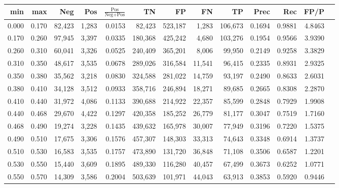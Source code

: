 \begin{tabular}{rrrrrrrrrrrrr}
\toprule
  min &   max &    Neg &   Pos & $\frac{\text{Pos}}{\text{Neg}+\text{Pos}}$ &      TN &      FP &      FN &      TP &   Prec &    Rec &   FP/P \\
\midrule
0.000 & 0.170 & 82,423 & 1,283 &                                     0.0153 &  82,423 & 523,187 &   1,283 & 106,673 & 0.1694 & 0.9881 & 4.8463 \\
0.170 & 0.260 & 97,945 & 3,397 &                                     0.0335 & 180,368 & 425,242 &   4,680 & 103,276 & 0.1954 & 0.9566 & 3.9390 \\
0.260 & 0.310 & 60,041 & 3,326 &                                     0.0525 & 240,409 & 365,201 &   8,006 &  99,950 & 0.2149 & 0.9258 & 3.3829 \\
0.310 & 0.350 & 48,617 & 3,535 &                                     0.0678 & 289,026 & 316,584 &  11,541 &  96,415 & 0.2335 & 0.8931 & 2.9325 \\
0.350 & 0.380 & 35,562 & 3,218 &                                     0.0830 & 324,588 & 281,022 &  14,759 &  93,197 & 0.2490 & 0.8633 & 2.6031 \\
0.380 & 0.410 & 34,128 & 3,512 &                                     0.0933 & 358,716 & 246,894 &  18,271 &  89,685 & 0.2665 & 0.8308 & 2.2870 \\
0.410 & 0.440 & 31,972 & 4,086 &                                     0.1133 & 390,688 & 214,922 &  22,357 &  85,599 & 0.2848 & 0.7929 & 1.9908 \\
0.440 & 0.468 & 29,670 & 4,422 &                                     0.1297 & 420,358 & 185,252 &  26,779 &  81,177 & 0.3047 & 0.7519 & 1.7160 \\
0.468 & 0.490 & 19,274 & 3,228 &                                     0.1435 & 439,632 & 165,978 &  30,007 &  77,949 & 0.3196 & 0.7220 & 1.5375 \\
0.490 & 0.510 & 17,675 & 3,306 &                                     0.1576 & 457,307 & 148,303 &  33,313 &  74,643 & 0.3348 & 0.6914 & 1.3737 \\
0.510 & 0.530 & 16,583 & 3,535 &                                     0.1757 & 473,890 & 131,720 &  36,848 &  71,108 & 0.3506 & 0.6587 & 1.2201 \\
0.530 & 0.550 & 15,440 & 3,609 &                                     0.1895 & 489,330 & 116,280 &  40,457 &  67,499 & 0.3673 & 0.6252 & 1.0771 \\
0.550 & 0.570 & 14,309 & 3,586 &                                     0.2004 & 503,639 & 101,971 &  44,043 &  63,913 & 0.3853 & 0.5920 & 0.9446 \\

\end{tabular}
